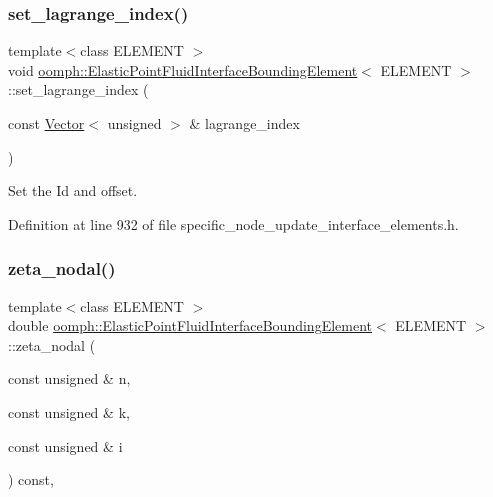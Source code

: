 \subsubsection{\texorpdfstring{set\+\_\+lagrange\+\_\+index()}{set\_lagrange\_index()}}
{\footnotesize\ttfamily template$<$class E\+L\+E\+M\+E\+NT $>$ \\
void \hyperlink{classoomph_1_1ElasticPointFluidInterfaceBoundingElement}{oomph\+::\+Elastic\+Point\+Fluid\+Interface\+Bounding\+Element}$<$ E\+L\+E\+M\+E\+NT $>$\+::set\+\_\+lagrange\+\_\+index (\begin{DoxyParamCaption}\item[{const \hyperlink{classoomph_1_1Vector}{Vector}$<$ unsigned $>$ \&}]{lagrange\+\_\+index }\end{DoxyParamCaption})\hspace{0.3cm}{\ttfamily [inline]}}



Set the Id and offset. 



Definition at line 932 of file specific\+\_\+node\+\_\+update\+\_\+interface\+\_\+elements.\+h.

\mbox{\label{classoomph_1_1ElasticPointFluidInterfaceBoundingElement_a9d72fee284b866769347fb471c5828ad}} 
\subsubsection{\texorpdfstring{zeta\+\_\+nodal()}{zeta\_nodal()}}
{\footnotesize\ttfamily template$<$class E\+L\+E\+M\+E\+NT $>$ \\
double \hyperlink{classoomph_1_1ElasticPointFluidInterfaceBoundingElement}{oomph\+::\+Elastic\+Point\+Fluid\+Interface\+Bounding\+Element}$<$ E\+L\+E\+M\+E\+NT $>$\+::zeta\+\_\+nodal (\begin{DoxyParamCaption}\item[{const unsigned \&}]{n,  }\item[{const unsigned \&}]{k,  }\item[{const unsigned \&}]{i }\end{DoxyParamCaption}) const\hspace{0.3cm}{\ttfamily [inline]}, {\ttfamily [virtual]}}



